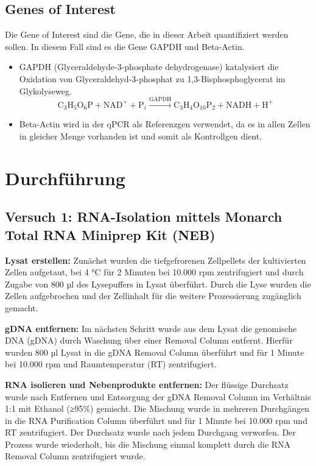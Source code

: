 \documentclass{article}
\begin{document}
\subsection*{Genes of Interest}
Die Gene of Interest sind die Gene, die in dieser Arbeit quantifiziert
werden sollen. In diesem Fall sind es die Gene GAPDH und Beta-Actin.
\begin{itemize}
    \item GAPDH (Glyceraldehyde-3-phosphate dehydrogenase) katalysiert die 
    Oxidation von Glyceraldehyd-3-phosphat zu
    1,3-Bisphosphoglycerat im Glykolyseweg.
\[
\text{C}_3\text{H}_5\text{O}_6\text{P} + \text{NAD}^+ + \text{P}_i \xrightarrow{\text{GAPDH}} \text{C}_3\text{H}_4\text{O}_{10}\text{P}_2 + \text{NADH} + \text{H}^+
\]

    \item Beta-Actin wird in der qPCR als Referenzgen verwendet, da es in allen
    Zellen in gleicher Menge vorhanden ist und somit als Kontrollgen dient.
    
\end{itemize}


\section*{Durchführung}

\subsection*{Versuch 1: RNA-Isolation mittels Monarch\textsuperscript{\textregistered} Total RNA Miniprep Kit (NEB)}

\textbf{Lysat erstellen:}
Zunächst wurden die tiefgefrorenen Zellpellets der kultivierten Zellen aufgetaut, bei 4 °C für 2 Minuten bei 10.000 rpm zentrifugiert und durch Zugabe von 800 µl des Lysepuffers in Lysat überführt. Durch die Lyse wurden die Zellen aufgebrochen und der Zellinhalt für die weitere Prozessierung zugänglich gemacht.

\textbf{gDNA entfernen:}
Im nächsten Schritt wurde aus dem Lysat die genomische DNA (gDNA) durch Waschung über einer Removal Column entfernt. Hierfür wurden 800 µl Lysat in die gDNA Removal Column überführt und für 1 Minute bei 10.000 rpm und Raumtemperatur (RT) zentrifugiert.

\textbf{RNA isolieren und Nebenprodukte entfernen:}
Der flüssige Durchsatz wurde nach Entfernen und Entsorgung der gDNA Removal Column im Verhältnis 1:1 mit Ethanol (≥95\%) gemischt. Die Mischung wurde in mehreren Durchgängen in die RNA Purification Column überführt und für 1 Minute bei 10.000 rpm und RT zentrifugiert. Der Durchsatz wurde nach jedem Durchgang verworfen. Der Prozess wurde wiederholt, bis die Mischung einmal komplett durch die RNA Removal Column zentrifugiert wurde.
\end{document}

